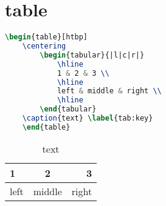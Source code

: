 \documentclass[11pt,a4paper]{article}
\begin{document}
\section{table}
\begin{lstlisting}[language = TeX]
	\begin{table}[htbp]
	\centering
		\begin{tabular}{|l|c|r|}
			\hline
			1 & 2 & 3 \\
			\hline
			left & middle & right \\
			\hline
		\end{tabular}
	\caption{text} \label{tab:key}
	\end{table}
\end{lstlisting}

\begin{table}[htbp]
	\centering
	\begin{tabular}{|l|c|r|}
		\hline
		1 & 2 & 3 \\
		\hline
		left & middle & right \\
		\hline
	\end{tabular}
	\caption{text} \label{tab:key}
\end{table}		
\end{document}
